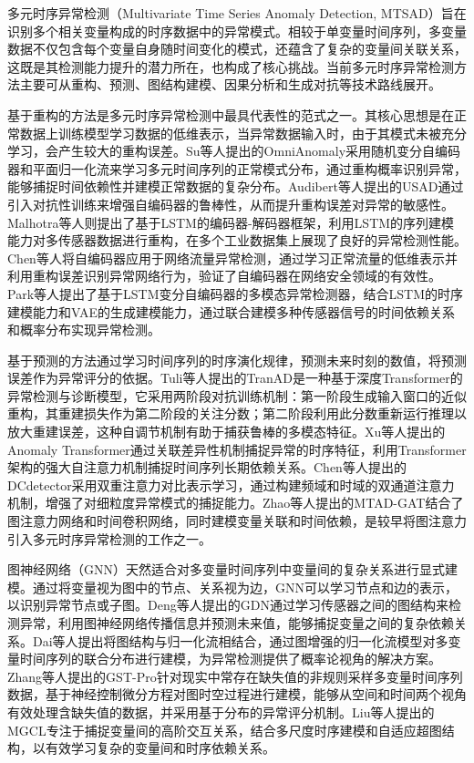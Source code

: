 多元时序异常检测（Multivariate Time Series Anomaly Detection, MTSAD）旨在识别多个相关变量构成的时序数据中的异常模式。相较于单变量时间序列，多变量数据不仅包含每个变量自身随时间变化的模式，还蕴含了复杂的变量间关联关系，这既是其检测能力提升的潜力所在，也构成了核心挑战\cite{chen2025tsadsurvey}。当前多元时序异常检测方法主要可从重构、预测、图结构建模、因果分析和生成对抗等技术路线展开。

基于重构的方法是多元时序异常检测中最具代表性的范式之一。其核心思想是在正常数据上训练模型学习数据的低维表示，当异常数据输入时，由于其模式未被充分学习，会产生较大的重构误差。Su等人\cite{su2019omni}提出的OmniAnomaly采用随机变分自编码器和平面归一化流来学习多元时间序列的正常模式分布，通过重构概率识别异常，能够捕捉时间依赖性并建模正常数据的复杂分布。Audibert等人\cite{audibert2020usad}提出的USAD通过引入对抗性训练来增强自编码器的鲁棒性，从而提升重构误差对异常的敏感性。Malhotra等人\cite{malhotra2016lstmencoder}则提出了基于LSTM的编码器-解码器框架，利用LSTM的序列建模能力对多传感器数据进行重构，在多个工业数据集上展现了良好的异常检测性能。Chen等人\cite{chen2018autoencoder}将自编码器应用于网络流量异常检测，通过学习正常流量的低维表示并利用重构误差识别异常网络行为，验证了自编码器在网络安全领域的有效性。Park等人\cite{park2018lstmvae}提出了基于LSTM变分自编码器的多模态异常检测器，结合LSTM的时序建模能力和VAE的生成建模能力，通过联合建模多种传感器信号的时间依赖关系和概率分布实现异常检测。

基于预测的方法通过学习时间序列的时序演化规律，预测未来时刻的数值，将预测误差作为异常评分的依据。Tuli等人\cite{tuli2022tranad}提出的TranAD是一种基于深度Transformer的异常检测与诊断模型，它采用两阶段对抗训练机制：第一阶段生成输入窗口的近似重构，其重建损失作为第二阶段的关注分数；第二阶段利用此分数重新运行推理以放大重建误差，这种自调节机制有助于捕获鲁棒的多模态特征。Xu等人\cite{xu2022anomaly}提出的Anomaly Transformer通过关联差异性机制捕捉异常的时序特征，利用Transformer架构的强大自注意力机制捕捉时间序列长期依赖关系。Chen等人\cite{chen2023dcdetector}提出的DCdetector采用双重注意力对比表示学习，通过构建频域和时域的双通道注意力机制，增强了对细粒度异常模式的捕捉能力。Zhao等人\cite{zhao2020mtadgat}提出的MTAD-GAT结合了图注意力网络\cite{velickovic2018gat}和时间卷积网络，同时建模变量关联和时间依赖，是较早将图注意力引入多元时序异常检测的工作之一。

图神经网络（GNN）\cite{kipf2017gcn,wu2021gnnsurvey}天然适合对多变量时间序列中变量间的复杂关系进行显式建模。通过将变量视为图中的节点、关系视为边，GNN可以学习节点和边的表示，以识别异常节点或子图。Deng等人\cite{deng2021graph}提出的GDN通过学习传感器之间的图结构来检测异常，利用图神经网络传播信息并预测未来值，能够捕捉变量之间的复杂依赖关系。Dai等人\cite{dai2022graph}提出将图结构与归一化流相结合，通过图增强的归一化流模型对多变量时间序列的联合分布进行建模，为异常检测提供了概率论视角的解决方案。Zhang等人\cite{zhang2024gstpro}提出的GST-Pro针对现实中常存在缺失值的非规则采样多变量时间序列数据，基于神经控制微分方程对图时空过程进行建模，能够从空间和时间两个视角有效处理含缺失值的数据，并采用基于分布的异常评分机制。Liu等人\cite{liu2025mgcl}提出的MGCL专注于捕捉变量间的高阶交互关系，结合多尺度时序建模和自适应超图结构，以有效学习复杂的变量间和时序依赖关系。

